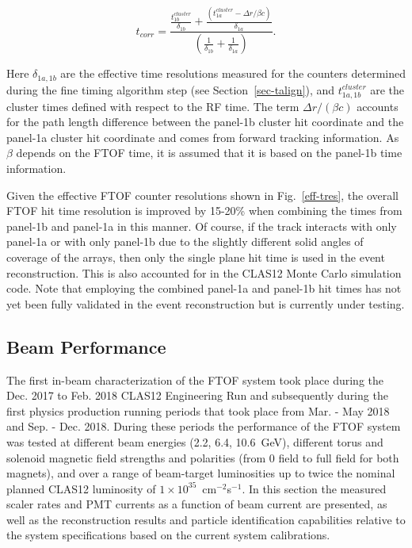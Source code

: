 \documentclass{elsart}
\begin{document}
\begin{equation}
  t_{corr} = \frac{\displaystyle \frac{\displaystyle t_{1b}^{cluster}}{\displaystyle \delta_{1b}} +
    \frac{\displaystyle (t_{1a}^{cluster} - \Delta r/\beta c)}{\displaystyle \delta_{1a}}}
  {\displaystyle \left( \frac{\displaystyle 1}{\displaystyle \delta_{1b}} +
    \frac{\displaystyle 1}{\displaystyle \delta_{1a}} \right)}.
\end{equation}

\noindent
Here $\delta_{1a,1b}$ are the effective time resolutions measured for the counters determined during
the fine timing algorithm step (see Section~\ref{sec-talign}), and $t_{1a,1b}^{cluster}$ are the cluster
times defined with respect to the RF time. The term $\Delta r/(\beta c)$ accounts for the path length
difference between the panel-1b cluster hit coordinate and the panel-1a cluster hit coordinate and comes
from forward tracking information. As $\beta$ depends on the FTOF time, it is assumed that it is based
on the panel-1b time information.

Given the effective FTOF counter resolutions shown in Fig.~\ref{eff-tres}, the overall FTOF hit
time resolution is improved by 15-20\% when combining the times from panel-1b and panel-1a in this
manner. Of course, if the track interacts with only panel-1a or with only panel-1b due to the slightly
different solid angles of coverage of the arrays, then only the single plane hit time is used in the
event reconstruction. This is also accounted for in the CLAS12 Monte Carlo simulation code. Note that
employing the combined panel-1a and panel-1b hit times has not yet been fully validated in the event
reconstruction but is currently under testing.
  
\subsection{Beam Performance}  
\label{sec:beam}

The first in-beam characterization of the FTOF system took place during the Dec. 2017 to Feb. 2018
CLAS12 Engineering Run and subsequently during the first physics production running periods that took
place from Mar. - May 2018 and Sep. - Dec. 2018. During these periods the performance of the FTOF
system was tested at different beam energies (2.2, 6.4, 10.6~GeV), different torus and solenoid magnetic
field strengths and polarities (from 0 field to full field for both magnets), and over a range of beam-target
luminosities up to twice the nominal planned CLAS12 luminosity of $1 \times 10^{35}$~cm$^{-2}$s$^{-1}$.
In this section the measured scaler rates and PMT currents as a function of beam current are presented,
as well as the reconstruction results and particle identification capabilities relative to the system
specifications based on the current system calibrations.
\end{document}
